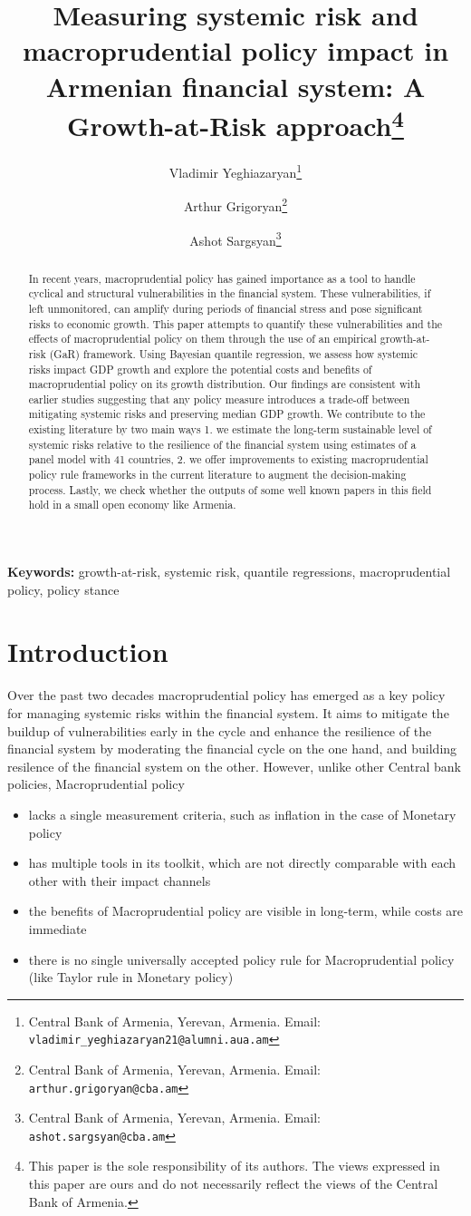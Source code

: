 \documentclass[12pt,a4paper]{article}
\title{Measuring systemic risk and macroprudential policy impact in Armenian financial system: A Growth-at-Risk approach\thanks{This paper is the sole responsibility of its authors. The views expressed in this paper are ours and do not necessarily reflect the views of the Central Bank of Armenia.}}
\author{
    Vladimir Yeghiazaryan\thanks{Central Bank of Armenia, Yerevan, Armenia. Email: \texttt{vladimir\_yeghiazaryan21@alumni.aua.am}} \and 
    Arthur Grigoryan\thanks{Central Bank of Armenia, Yerevan, Armenia. Email: \texttt{arthur.grigoryan@cba.am}} \and 
    Ashot Sargsyan\thanks{Central Bank of Armenia, Yerevan, Armenia. Email: \texttt{ashot.sargsyan@cba.am}}
}
\begin{document}
\onehalfspacing
\captionsetup{font=small}

\maketitle
\begin{abstract}
    In recent years, macroprudential policy has gained importance as a tool to handle cyclical and structural vulnerabilities in the financial system. These vulnerabilities, if left unmonitored, can amplify during periods of financial stress and pose significant risks to economic growth.
    This paper attempts to quantify these vulnerabilities and the effects of macroprudential policy on them through the use of an empirical growth-at-risk (GaR) framework. Using Bayesian quantile regression, we assess how systemic risks impact GDP growth and explore the potential costs and benefits of macroprudential policy on its growth distribution. Our findings are consistent with earlier studies suggesting that any policy measure introduces a trade-off between mitigating systemic risks and preserving median GDP growth.
    We contribute to the existing literature by two main ways 1. we estimate the long-term sustainable level of systemic risks relative to the resilience of the financial system using estimates of a panel model with 41 countries, 2. we offer improvements to existing macroprudential policy rule frameworks in the current literature to augment the decision-making process. Lastly, we check whether the outputs of some well known papers in this field hold in a small open economy like Armenia.
\end{abstract}

\noindent\textbf{Keywords:} growth-at-risk, systemic risk, quantile regressions, macroprudential policy, policy stance

    
\section{Introduction}
\label{introduction}
Over the past two decades macroprudential policy has emerged as a key policy for managing systemic risks within the financial system. It aims to mitigate the buildup of vulnerabilities early in the cycle and enhance the resilience of the financial system by moderating the financial cycle on the one hand, and building resilence of the financial system on the other. However, unlike other Central bank policies, Macroprudential policy
\begin{itemize}
    \item lacks a single measurement criteria, such as inflation in the case of Monetary policy
    \item has multiple tools in its toolkit, which are not directly comparable with each other with their impact channels
    \item the benefits of Macroprudential policy are visible in long-term, while costs are immediate
    \item there is no single universally accepted policy rule for Macroprudential policy (like Taylor rule in Monetary policy)
\end{itemize}
\end{document}
